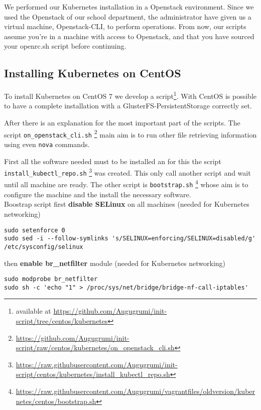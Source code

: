 We performed our Kubernetes installation in a Openstack environment.
Since we used the Openstack of our school department, the administrator
have given us a virtual machine, Openstack-CLI, to perform
operations. From now, our scripts assume you're in a machine with access
to Openstack, and that you have sourced your openrc.sh script before
continuing.

\subsection{Installing Kubernetes on CentOS}
\label{installing-kubernetes-on-centos}

To install Kubernetes on CentOS 7 we develop a script\footnote{available
at \url{https://github.com/Augugrumi/init-script/tree/centos/kubernetes}}.
With CentOS is possible to have a complete installation with
a GlusterFS-PersistentStorage correctly set.

After there is an explanation for the most important part of the
scripts. The script \verb!on_openstack_cli.sh!
\footnote{\url{https://github.com/Augugrumi/init-script/raw/centos/kubernetes/on_openstack_cli.sh}}
main aim is to run other file retrieving information using even
\texttt{nova} commands.

First all the software needed must to be installed an for this the
script \\\verb!install_kubectl_repo.sh!
\footnote{\url{https://raw.githubusercontent.com/Augugrumi/init-script/centos/kubernetes/install_kubectl_repo.sh}}
was created. This only call another script and wait until all machine
are ready. The other script is \verb!bootstrap.sh!
\footnote{\url{https://raw.githubusercontent.com/Augugrumi/vagrantfiles/oldversion/kubernetes/centos/bootstrap.sh}}
whose aim is to configure the machine and the install the necessary
software.\\
Boostrap script first \textbf{disable SELinux} on all machines (needed
for Kubernetes networking)

\begin{lstlisting}
sudo setenforce 0
sudo sed -i --follow-symlinks 's/SELINUX=enforcing/SELINUX=disabled/g' /etc/sysconfig/selinux
\end{lstlisting}

then \textbf{enable br\_netfilter} module (needed for Kubernetes
networking)

\begin{lstlisting}
sudo modprobe br_netfilter
sudo sh -c 'echo "1" > /proc/sys/net/bridge/bridge-nf-call-iptables'
\end{lstlisting}

